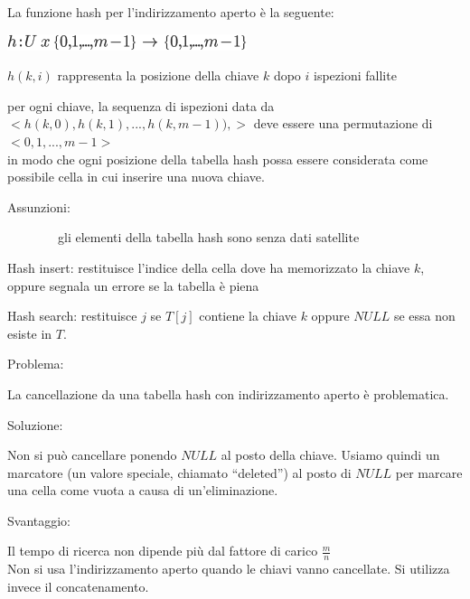 \documentclass{article}
\begin{document}
{{}

{La funzione hash per l'indirizzamento aperto è la seguente:}

\includegraphics{images/image272.png}

{$h(k,i)$ rappresenta la posizione della chiave $k$ dopo $i$ ispezioni fallite}

{}

{per ogni chiave, la sequenza di ispezioni data da \\
$<h(k,0),h(k,1),...,h(k,m-1)),>$ deve essere una permutazione di $<0,1,...,m-1>$ \\ in modo che ogni posizione della tabella hash possa essere considerata come possibile cella in cui inserire una nuova chiave.}

{}

{Assunzioni:}

{~~~~~~~~gli elementi della tabella hash sono senza dati satellite}

{}

{Hash insert: restituisce l'indice della cella dove ha memorizzato la chiave $k$, oppure segnala un errore se la tabella è piena}

\protect\hypertarget{t.7217df0c08ad885ebc654960645bab5fae2cfb4d}{}{}\protect\hypertarget{t.35}{}{}



{Hash search: restituisce $j$ se $T[j]$ contiene la chiave $k$ oppure $NULL$ se essa non esiste in $T$.}

{}

\protect\hypertarget{t.9facc68cfa90288f5906042d8bc73266aeff5bdd}{}{}\protect\hypertarget{t.36}{}{}




{Problema:}

{La cancellazione da una tabella hash con indirizzamento aperto è problematica. }

{}

{Soluzione:}

{Non si può cancellare ponendo $NULL$ al posto della chiave. Usiamo quindi un marcatore (un valore speciale, chiamato ``deleted'') al posto di $NULL$ per marcare una cella come vuota a causa di un'eliminazione.}

{}

{Svantaggio:}

{Il tempo di ricerca non dipende più dal fattore di carico $\frac{m}{n}$}\\
{Non si usa l'indirizzamento aperto quando le chiavi vanno cancellate.
Si utilizza invece il concatenamento.}

}
\end{document}
